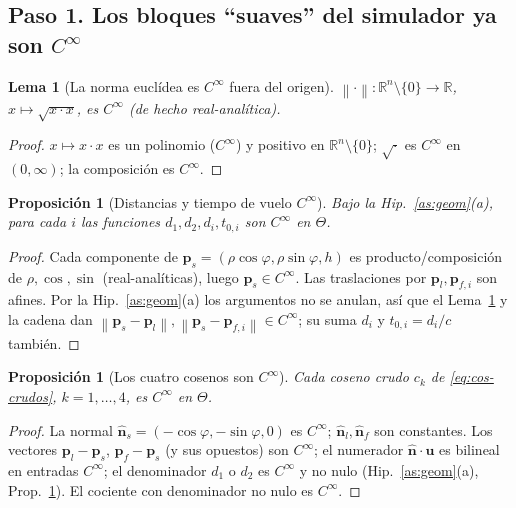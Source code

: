 \documentclass[11pt,a4paper]{article}
\theoremstyle{plain}
\newtheorem{lemma}[theorem]{Lema}
\newtheorem{proposition}[theorem]{Proposici\'on}
\theoremstyle{definition}
\newcommand{\vect}[1]{\boldsymbol{#1}}
\newcommand{\R}{\mathbb{R}}
\newcommand{\norm}[1]{\left\lVert #1 \right\rVert}
\begin{document}
\subsection*{Paso 1. Los bloques ``suaves'' del simulador ya son \texorpdfstring{$C^\infty$}{C-inf}}
\label{sec:reg-suaves}

\begin{lemma}[La norma eucl\'idea es $C^\infty$ fuera del origen]\label{lem:norm}
$\norm{\cdot}:\R^n\setminus\{0\}\to\R$, $x\mapsto\sqrt{x\cdot x}$, es $C^\infty$
(de hecho real-anal\'itica).
\end{lemma}
\begin{proof}
$x\mapsto x\cdot x$ es un polinomio ($C^\infty$) y positivo en
$\R^n\setminus\{0\}$; $\sqrt{\cdot}$ es $C^\infty$ en $(0,\infty)$; la
composici\'on es $C^\infty$.
\end{proof}

\begin{proposition}[Distancias y tiempo de vuelo $C^\infty$]\label{prop:dist}
Bajo la Hip.~\ref{as:geom}(a), para cada $i$ las funciones $d_1,d_2,d_i,t_{0,i}$
son $C^\infty$ en $\Theta$.
\end{proposition}
\begin{proof}
Cada componente de $\vect{p}_s=(\rho\cos\varphi,\rho\sin\varphi,h)$ es
producto/composici\'on de $\rho,\cos,\sin$ (real-anal\'iticas), luego
$\vect{p}_s\in C^\infty$. Las traslaciones por $\vect{p}_l,\vect{p}_{f,i}$ son
afines. Por la Hip.~\ref{as:geom}(a) los argumentos no se anulan, as\'i que el
Lema~\ref{lem:norm} y la cadena dan $\norm{\vect{p}_s-\vect{p}_l},
\norm{\vect{p}_s-\vect{p}_{f,i}}\in C^\infty$; su suma $d_i$ y $t_{0,i}=d_i/c$
tambi\'en.
\end{proof}

\begin{proposition}[Los cuatro cosenos son $C^\infty$]\label{prop:cos}
Cada coseno crudo $c_k$ de \eqref{eq:cos-crudos},
$k=1,\dots,4$, es $C^\infty$ en $\Theta$.
\end{proposition}
\begin{proof}
La normal $\hat{\vect n}_s=(-\cos\varphi,-\sin\varphi,0)$ es $C^\infty$;
$\hat{\vect n}_l,\hat{\vect n}_f$ son constantes. Los vectores $\vect p_l-\vect
p_s$, $\vect p_f-\vect p_s$ (y sus opuestos) son $C^\infty$; el numerador
$\hat{\vect n}\!\cdot\!\vect u$ es bilineal en entradas $C^\infty$; el denominador
$d_1$ o $d_2$ es $C^\infty$ y no nulo (Hip.~\ref{as:geom}(a),
Prop.~\ref{prop:dist}). El cociente con denominador no nulo es $C^\infty$.
\end{proof}
\end{document}
